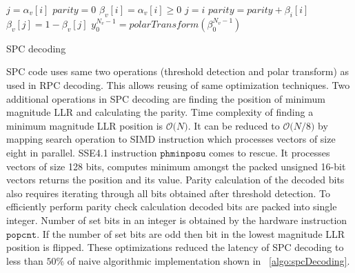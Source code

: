 \IncMargin{1.5em}
\begin{algorithm}[]
	 {
			$j = \alpha_{v}[i]$ \;
			$parity = 0$ \;
			 {
				$\beta_{v}[i] = \alpha_{v}[i] \ge 0$\;
				 {
					$j = i$ \;
				}
				$parity = parity + \beta_{\textit{i}}[i]$ \;
			}
		 {
			$\beta_{v}[j] = 1 - \beta_{v}[j]$\;
		}
		$y_{0}^{N_v-1} = polarTransform(\beta_{0}^{N_v-1})$ \;
		}
	\caption{SPC decoding}
	\label{algo:spcDecoding}
\end{algorithm}
\DecMargin{1.5em}

SPC code uses same two operations (threshold detection and polar transform) as used in RPC decoding. This allows reusing of same optimization techniques. Two additional operations in SPC decoding are finding the position of minimum magnitude LLR and calculating the parity. Time complexity of finding a minimum magnitude LLR position is $\mathcal{O}\big(N\big)$. It can be reduced to $\mathcal{O}\big(N/8\big)$ by mapping search operation to SIMD instruction which processes vectors of size eight in parallel. SSE4.1 instruction $\mathtt{phminposu}$ comes to rescue. It processes vectors of size 128 bits, computes minimum amongst the packed unsigned 16-bit vectors returns the position and its value. Parity calculation of the decoded bits also requires iterating through all bits obtained after threshold detection. To efficiently perform parity check calculation decoded bits are packed into single integer. Number of set bits in an integer is obtained by the hardware instruction $\mathtt{popcnt}$. If the number of set bits are odd then bit in the lowest magnitude LLR position is flipped. These optimizations reduced the latency of SPC decoding to less than $50\%$ of naive algorithmic implementation shown in ~\ref{algo:spcDecoding}.

